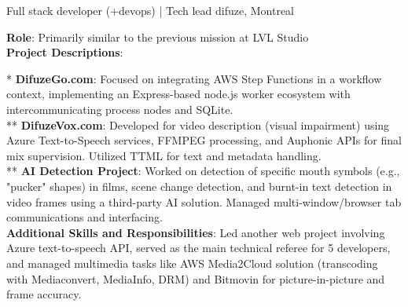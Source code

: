 \documentclass[
  a4paper,
   maincolor=cvblue,
   sectioncolor=cvblue,
]{fortysecondscv}
\begin{document}
\newpage
\restoregeometry
{}\paperwidth

\makefrontsidebar

\begin{cvtable}
    {Full stack developer (+devops) | Tech lead}
    {difuze, Montreal}
    {
      \textbf{Role}: Primarily similar to the previous mission at LVL Studio\\      \textbf{Project Descriptions}:

      * \textbf{DifuzeGo.com}: Focused on integrating AWS Step Functions in a workflow context, implementing an Express-based node.js worker ecosystem with intercommunicating process nodes and SQLite. \\
      ** \textbf{DifuzeVox.com}: Developed for video description (visual impairment) using Azure Text-to-Speech services, FFMPEG processing, and Auphonic APIs for final mix supervision. Utilized TTML for text and metadata handling.\\
      ** \textbf{AI Detection Project}: Worked on detection of specific mouth symbols (e.g., "pucker" shapes) in films, scene change detection, and burnt-in text detection in video frames using a third-party AI solution. Managed multi-window/browser tab communications and interfacing.\\
      \textbf{Additional Skills and Responsibilities}: Led another web project involving Azure text-to-speech API, served as the main technical referee for 5 developers, and managed multimedia tasks like AWS Media2Cloud solution (transcoding with Mediaconvert, MediaInfo, DRM) and Bitmovin for picture-in-picture and frame accuracy.\\
    }
\end{cvtable}
\end{document}
